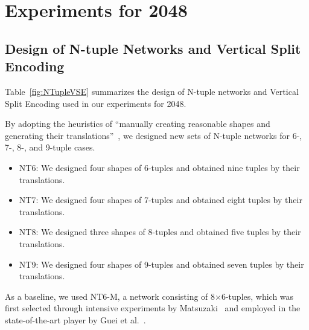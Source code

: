 \section{Experiments for 2048}

\subsection{Design of N-tuple Networks and Vertical Split Encoding}


Table~\ref{fig:NTupleVSE} summarizes the design of N-tuple networks and Vertical Split Encoding
used in our experiments for 2048.

By adopting the heuristics of ``manually creating reasonable shapes and generating their translations''~\cite{Jask18}, we designed new sets of N-tuple networks for 6-, 7-, 8-, and 9-tuple cases.
\begin{itemize}
\item \textsf{NT6}: We designed four shapes of 6-tuples and obtained nine tuples by their translations.
\item \textsf{NT7}: We designed four shapes of 7-tuples and obtained eight tuples by their translations.
\item \textsf{NT8}: We designed three shapes of 8-tuples and obtained five tuples by their translations.
\item \textsf{NT9}: We designed four shapes of 9-tuples and obtained seven tuples by their translations.
\end{itemize}
As a baseline, we used \textsf{NT6-M}, a network consisting of 8$\times$6-tuples, which was first selected through intensive experiments by Matsuzaki~\cite{Mats16} and employed in the state-of-the-art player by Guei et al.~\cite{GuCW22}.

